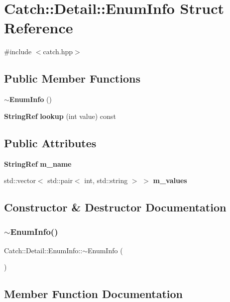 \section{Catch\+::Detail\+::Enum\+Info Struct Reference}
\label{struct_catch_1_1_detail_1_1_enum_info}


{\ttfamily \#include $<$catch.\+hpp$>$}

\subsection*{Public Member Functions}
\begin{DoxyCompactItemize}
\item 
\textbf{ $\sim$\+Enum\+Info} ()
\item 
\textbf{ String\+Ref} \textbf{ lookup} (int value) const
\end{DoxyCompactItemize}
\subsection*{Public Attributes}
\begin{DoxyCompactItemize}
\item 
\textbf{ String\+Ref} \textbf{ m\+\_\+name}
\item 
std\+::vector$<$ std\+::pair$<$ int, std\+::string $>$ $>$ \textbf{ m\+\_\+values}
\end{DoxyCompactItemize}


\subsection{Constructor \& Destructor Documentation}
\mbox{\label{struct_catch_1_1_detail_1_1_enum_info_ab6608593c00614a688045fe8d911258d}} 
\subsubsection{$\sim$EnumInfo()}
{\footnotesize\ttfamily Catch\+::\+Detail\+::\+Enum\+Info\+::$\sim$\+Enum\+Info (\begin{DoxyParamCaption}{ }\end{DoxyParamCaption})}



\subsection{Member Function Documentation}
\mbox{\label{struct_catch_1_1_detail_1_1_enum_info_a2fdfacc411d7afb1cb690366e5e49cb3}} 
